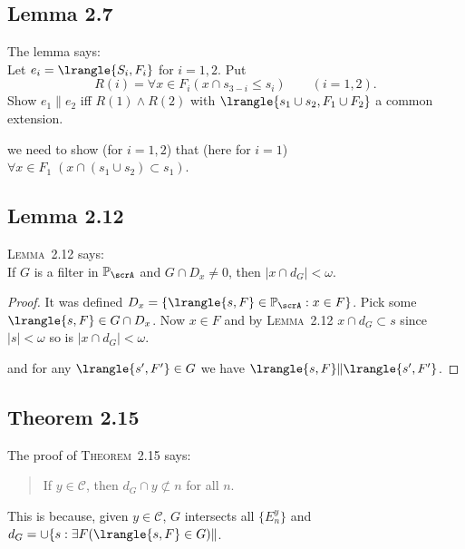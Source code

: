 \subsection{Lemma 2.7}

The lemma says:\\
Let \(e_i=\lrangle{S_i,F_i}\) for \(i=1,2\). Put
\begin{equation*}
R(i) = \forall x\in F_i(x \cap s_{3-i} \leq s_i) \qquad (i=1,2).
\end{equation*}
Show \(e_1\|e_2\) iff \(R(1) \land R(2)\)
with \(\lrangle{s_1\cup s_2,F_1\cup F_2}\) a common extension.

we need to show (for \(i=1,2\)) that (here for \(i=1\))
\(\forall x \in F_1\;(x\cap (s_1\cup s_2) \subset s_1)\).

\subsection{Lemma 2.12}

\textsc{Lemma}~2.12 says:\\
If $G$ is a filter in \(\mathbb{P}_\scrA\) and 
\(G\cap D_x\neq 0\), then \(|x\cap d_G|< \omega\).
\begin{proof}
It was defined \(D_x = \{\lrangle{s,F}\in\mathbb{P}_\scrA: x\in F\}\).
Pick some \(\lrangle{s,F}\in G\cap D_x\).
Now \(x\in F\) and by \textsc{Lemma}~2.12 \(x\cap d_G \subset s\)
since \(|s|<\omega\) so is \(|x\cap d_G|<\omega\).


and for any \(\lrangle{s',F'}\in G\)
we have \(\lrangle{s,F}\|\lrangle{s',F'}\).
\end{proof}

\subsection{Theorem 2.15}

The proof of \textsc{Theorem}~2.15 says:
\begin{quote}
If \(y\in \mathscr{C}\), then \(d_G \cap y \not\subset n\) for all $n$.
\end{quote}
This is because, given \(y\in\mathscr{C}\), $G$ intersects
all \(\{E_n^y\}\) and \(d_G = \cup\{s: \exists F(\lrangle{s,F}\in G)\|\).

